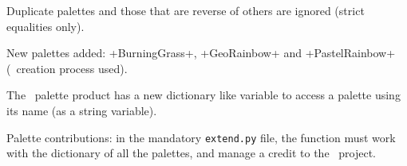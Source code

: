 \documentclass{tutodoc}
\begin{document}
\small

\begin{tdocbreak}
    \item Duplicate palettes and those that are reverse of others are ignored (strict equalities only).
\end{tdocbreak}




\begin{tdocnew}
    \item New palettes added: +BurningGrass+, +GeoRainbow+ and +PastelRainbow+ (\LUADRAW\ creation process used).

    \item The \LUADRAW\ palette product has a new dictionary like variable  to access a palette using its name (as a string variable).
\end{tdocnew}




\begin{tdocupdate}
    \item Palette contributions: in the mandatory \verb+extend.py+ file, the  function must work with the dictionary of all the palettes, and manage a credit to the \thisproj\ project.
\end{tdocupdate}
\end{document}
